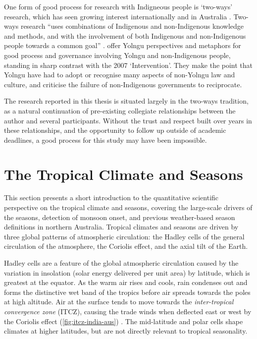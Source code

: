 One form of good process for research with Indigneous people is `two-ways'
research, which has seen growing interest internationally and in Australia
\citep{turner2009,prober2011}.  Two-ways research ``uses combinations of
Indigenous and non-Indigenous knowledge and methods, and with the involvement
of both Indigenous and non-Indigenous people towards a common goal''
\citep{ens2014}.
%
\citet{marika2009} offer Yolngu perspectives and metaphors for good process
and governance involving Yolngu and non-Indigenous people, standing in sharp
contrast with the 2007 `Intervention'.  They make the point that Yolngu have
had to adopt or recognise many aspects of non-Yolngu law and culture, and
criticise the failure of non-Indigenous governments to reciprocate.


The research reported in this thesis is situated largely in the two-ways tradition,
as a natural continuation of pre-existing collegiate relationships between
the author and several participants.  Without the
trust and respect built over years in these relationships, and the opportunity
to follow up outside of academic deadlines, a good process for this study
may have been impossible.



\section{The Tropical Climate and Seasons}
\label{sec:lit-tropical-climate}

This section presents a short introduction to the quantitative scientific
perspective on the tropical climate and seasons, covering the large-scale
drivers of the seasons, detection of monsoon onset, and previous
weather-based season definitions in northern Australia.
%
Tropical climates and seasons are driven by three global patterns of
atmospheric circulation:  the Hadley cells of the general circulation of
the atmosphere, the Coriolis effect, and the axial tilt of the Earth.

Hadley cells are a feature of the global atmospheric circulation
caused by the variation in insolation (solar energy delivered per unit area)
by latitude, which is greatest at the equator.  As the warm air rises and
cools, rain condenses out and forms the distinctive wet band of the tropics
before air spreads towards the poles at high altitude.
Air at the surface tends to move towards the \textit{inter-tropical
convergence zone} (ITCZ), causing the trade winds when deflected east or west
by the Coriolis effect (\cref{fig:itcz-india-aus}) \citep{kump2010}.
The mid-latitude and polar cells shape climates at higher
latitudes, but are not directly relevant to tropical seasonality.

